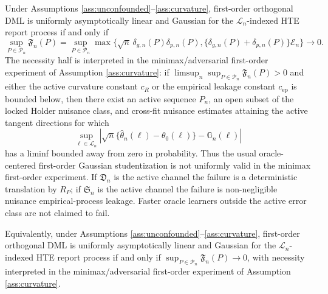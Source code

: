 \begin{theorem}\label{thm:frontier}
Under Assumptions \ref{ass:unconfounded}--\ref{ass:curvature}, first-order
orthogonal DML is uniformly asymptotically linear and Gaussian for the
\(\mathcal{L}_n\)-indexed HTE report process if and only if
\[
\sup_{P\in\mathcal{P}_n}\mathfrak{F}_n(P)
=\sup_{P\in\mathcal{P}_n}\max\{\sqrt n\,\delta_{g,n}(P)\delta_{p,n}(P),
\{\delta_{g,n}(P)+\delta_{p,n}(P)\}\mathcal{E}_n\}
\longrightarrow0 .
\]
The necessity half is interpreted in the minimax/adversarial first-order
experiment of Assumption \ref{ass:curvature}: if
\(\limsup_n\sup_{P\in\mathcal{P}_n}\mathfrak{F}_n(P)>0\) and either the active
curvature constant \(c_R\) or the empirical leakage constant \(c_{\mathrm{ep}}\)
is bounded below, then there exist an active sequence \(P_n\), an open subset
of the locked Holder nuisance class, and cross-fit nuisance estimates attaining
the active tangent directions for which
\[
\sup_{\ell\in\mathcal{L}_n}
\left|\sqrt n\{\hat\theta_n(\ell)-\theta_0(\ell)\}-\mathbb{G}_n(\ell)\right|
\]
has a liminf bounded away from zero in probability.  Thus the usual
oracle-centered first-order Gaussian studentization is not uniformly valid in
the minimax first-order experiment.  If \(\mathfrak{D}_n\) is the active
channel the failure is a deterministic translation by \(R_P\); if
\(\mathfrak{S}_n\) is the active channel the failure is non-negligible nuisance
empirical-process leakage.  Faster oracle learners outside the active error
class are not claimed to fail.

Equivalently, under Assumptions \ref{ass:unconfounded}--\ref{ass:curvature}, first-order orthogonal DML is uniformly asymptotically linear and Gaussian for the \(\mathcal{L}_n\)-indexed HTE report process if and only if \(\sup_{P\in\mathcal{P}_n}\mathfrak{F}_n(P)\to0\), with necessity interpreted in the minimax/adversarial first-order experiment of Assumption \ref{ass:curvature}.
\end{theorem}


